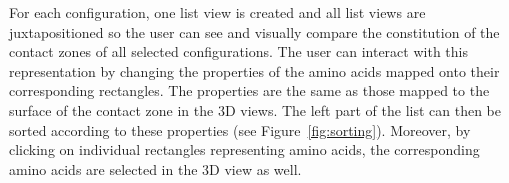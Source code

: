 \documentclass[twocolumn]{bmcart}%
\begin{document}
For each configuration, one list view is created and all list views are juxtapositioned so the user can see and visually compare the constitution of the contact zones of all selected configurations.
The user can interact with this representation by changing the properties of the amino acids mapped onto their corresponding rectangles.
The properties are the same as those mapped to the surface of the contact zone in the 3D views.
The left part of the list can then be sorted according to these properties (see Figure~\ref{fig:sorting}).
Moreover, by clicking on individual rectangles representing amino acids, the corresponding amino acids are selected in the 3D view as well.

\begin{figure}[tb]
    \centering
    \vspace{-5pt}

\end{figure}
\end{document}
